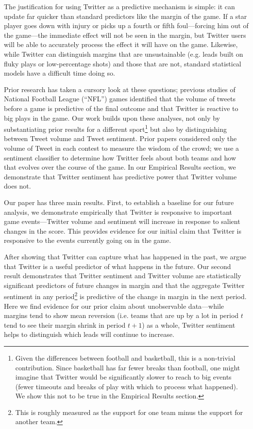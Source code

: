 \documentclass[12pt]{article}
\begin{document}
\begin{doublespacing}
The justification for using Twitter as a predictive mechanism is simple: it can update far quicker than standard predictors like the margin of the game. If a star player goes down with injury or picks up a fourth or fifth foul---forcing him out of the game---the immediate effect will not be seen in the margin, but Twitter users will be able to accurately process the effect it will have on the game. Likewise, while Twitter can distinguish margins that are unsustainable (e.g. leads built on fluky plays or low-percentage shots) and those that are not, standard statistical models have a difficult time doing so. 

Prior research has taken a cursory look at these questions; previous studies of National Football League (``NFL'') games identified that the volume of tweets before a game is predictive of the final outcome and that Twitter is reactive to big plays in the game. Our work builds upon these analyses, not only by substantiating prior results for a different sport\footnote{Given the differences between football and basketball, this is a non-trivial contribution. Since basketball has far fewer breaks than football, one might imagine that Twitter would be significantly slower to reach to big events (fewer timeouts and breaks of play with which to process what happened). We show this not to be true in the Empirical Results section.} but also by distinguishing between Tweet volume and Tweet sentiment. Prior papers considered only the volume of Tweet in each contest to measure the wisdom of the crowd; we use a sentiment classifier to determine how Twitter feels about both teams and how that evolves over the course of the game. In our Empirical Results section, we demonstrate that Twitter sentiment has predictive power that Twitter volume does not.  

Our paper has three main results. First, to establish a baseline for our future analysis, we demonstrate empirically that Twitter is responsive to important game events---Twitter volume and sentiment will increase in response to salient changes in the score. This provides evidence for our initial claim that Twitter is responsive to the events currently going on in the game.  

After showing that Twitter can capture what has happened in the past, we argue that Twitter is a useful predictor of what happens in the future. Our second result demonstrates that Twitter sentiment and Twitter volume are statistically significant predictors of future changes in margin and that the aggregate Twitter sentiment in any period\footnote{This is roughly measured as the support for one team minus the support for another team.} is predictive of the change in margin in the next period. Here we find evidence for our prior claim about unobservable data---while margins tend to show mean reversion (i.e. teams that are up by a lot in period $t$ tend to see their margin shrink in period $t+1$) as a whole, Twitter sentiment helps to distinguish which leads will continue to increase. 


\end{doublespacing}
\end{document}
